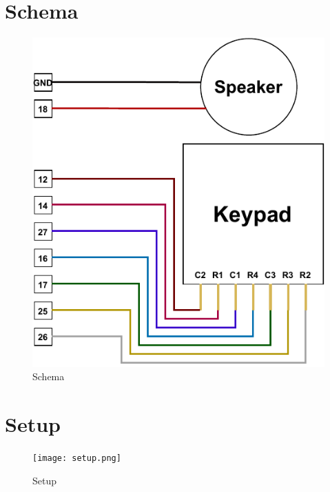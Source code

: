 \documentclass[a4paper, 11pt, twocolumn]{article}
\begin{document}
\clearpage
\appendix
\section{Schema}
    \begin{figure}[ht]
    		\centering
    		\includegraphics[width=1 \linewidth]{schema.pdf}
    		\caption{Schema}
    \end{figure}
\vfill\eject
\section{Setup}
    \begin{figure}[ht]
    		\centering
    		\texttt{[image: setup.png]}
    		\caption{Setup}
    \end{figure}
\end{document}

